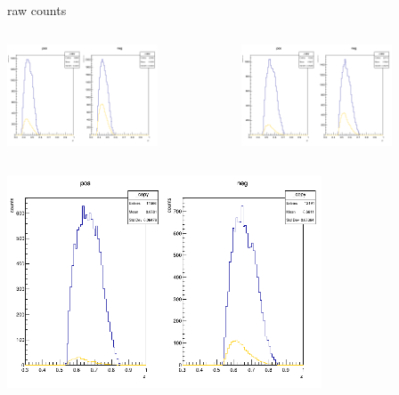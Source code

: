 \begin{frame}{raw counts}
\begin{columns}
\begin{column}[T]{0.5\textwidth}
\includegraphics[width = 0.7\textwidth]{results/yield/statistics/counts_x_Q2_z_0.60_5.500_0.45.png}
\end{column}
\begin{column}[T]{0.5\textwidth}
\includegraphics[width = 0.7\textwidth]{results/yield/statistics/counts_x_Q2_z_0.60_5.500_0.55.png}
\end{column}
\end{columns}
\begin{columns}
\begin{column}[T]{0.5\textwidth}
\includegraphics[width = 0.7\textwidth]{results/yield/statistics/counts_x_Q2_z_0.60_5.500_0.65.png}

\end{column}
\end{columns}
\end{frame}
